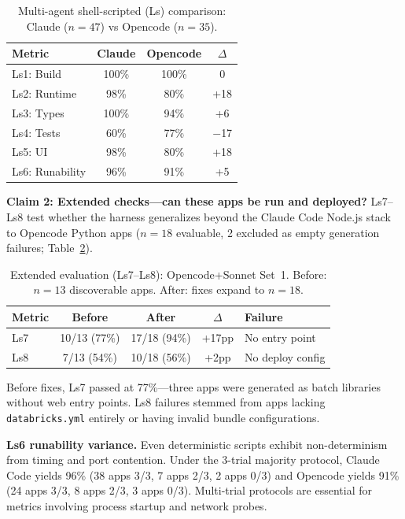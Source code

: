 \documentclass[sigconf,review]{acmart}
\begin{document}
\begin{table}[h]
\caption{Multi-agent shell-scripted (Ls) comparison: Claude ($n{=}47$) vs Opencode ($n{=}35$).}
\label{tab:multiagent}
\centering
\small
\begin{tabular}{lccc}
\toprule
\textbf{Metric} & \textbf{Claude} & \textbf{Opencode} & \textbf{$\Delta$} \\
\midrule
Ls1: Build & 100\% & 100\% & 0 \\
Ls2: Runtime & 98\% & 80\% & +18 \\
Ls3: Types & 100\% & 94\% & +6 \\
Ls4: Tests & 60\% & 77\% & $-$17 \\
Ls5: UI & 98\% & 80\% & +18 \\
Ls6: Runability & 96\% & 91\% & +5 \\
\bottomrule
\end{tabular}
\end{table}

\textbf{Claim 2: Extended checks---can these apps be run and deployed?} Ls7--Ls8 test whether the harness generalizes beyond the Claude Code Node.js stack to Opencode Python apps ($n{=}18$ evaluable, 2 excluded as empty generation failures; Table~\ref{tab:agentic}).

\begin{table}[h]
\caption{Extended evaluation (Ls7--Ls8): Opencode+Sonnet Set~1. Before: $n{=}13$ discoverable apps. After: fixes expand to $n{=}18$.}
\label{tab:agentic}
\centering
\small
\begin{tabular}{lcccl}
\toprule
\textbf{Metric} & \textbf{Before} & \textbf{After} & \textbf{$\Delta$} & \textbf{Failure} \\
\midrule
Ls7 & 10/13 (77\%) & 17/18 (94\%) & +17pp & No entry point \\
Ls8 & 7/13 (54\%) & 10/18 (56\%) & +2pp & No deploy config \\
\bottomrule
\end{tabular}
\end{table}

Before fixes, Ls7 passed at 77\%---three apps were generated as batch libraries without web entry points. Ls8 failures stemmed from apps lacking \texttt{databricks.yml} entirely or having invalid bundle configurations.

\textbf{Ls6 runability variance.} Even deterministic scripts exhibit non-determinism from timing and port contention. Under the 3-trial majority protocol, Claude Code yields 96\% (38 apps 3/3, 7 apps 2/3, 2 apps 0/3) and Opencode yields 91\% (24 apps 3/3, 8 apps 2/3, 3 apps 0/3). Multi-trial protocols are essential for metrics involving process startup and network probes.
\end{document}
